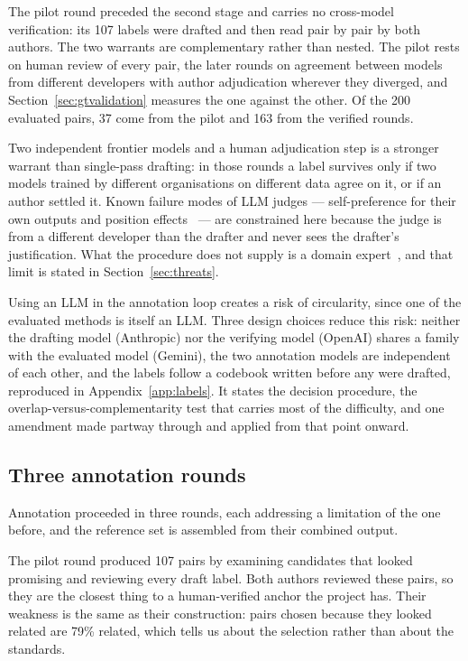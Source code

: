 The pilot round preceded the second stage and carries no cross-model
verification: its 107 labels were drafted and then read pair by pair by both
authors. The two warrants are complementary rather than nested. The pilot rests
on human review of every pair, the later rounds on agreement between models from
different developers with author adjudication wherever they diverged, and
Section~\ref{sec:gtvalidation} measures the one against the other. Of the 200
evaluated pairs, 37 come from the pilot and 163 from the verified rounds.

Two independent frontier models and a human adjudication step is a stronger
warrant than single-pass drafting: in those rounds a label survives only if two
models trained by different organisations on different data agree on it, or if
an author settled it. Known failure modes of LLM judges --- self-preference for their own
outputs and position effects~\cite{zheng2023judge} --- are constrained here
because the judge is from a different developer than the drafter and never sees
the drafter's justification. What the procedure does not supply is a domain
expert~\cite{ziems2024css}, and that limit is stated in
Section~\ref{sec:threats}.

Using an LLM in the annotation loop creates a risk of circularity, since one
of the evaluated methods is itself an LLM. Three design choices reduce this
risk: neither the drafting model (Anthropic) nor the verifying model (OpenAI)
shares a family with the evaluated model (Gemini), the two annotation models
are independent of each other, and the labels follow a codebook written before
any were drafted, reproduced in Appendix~\ref{app:labels}. It states the decision
procedure, the overlap-versus-complementarity test that carries most of the
difficulty, and one amendment made partway through and applied from that point
onward.

\subsection{Three annotation rounds}\label{sec:sampling}

Annotation proceeded in three rounds, each addressing a limitation of the one
before, and the reference set is assembled from their combined output.

The pilot round produced 107 pairs by examining candidates that looked
promising and reviewing every draft label. Both authors reviewed these pairs, so
they are the closest thing to a human-verified anchor the project has. Their
weakness is the same as their construction: pairs chosen because they looked
related are 79\% related, which tells us about the selection rather than about
the standards.


